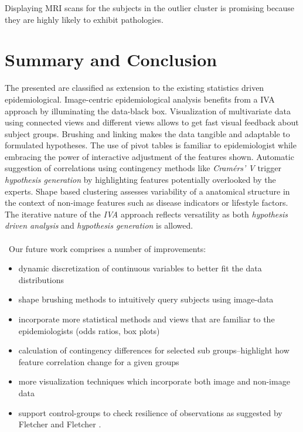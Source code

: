 \documentclass[journal]{style/vgtc} 			          %
\begin{document}
Displaying MRI scans for the subjects in the outlier cluster is promising because they are highly likely to exhibit pathologies.
%


\section{Summary and Conclusion}
The presented are classified as extension to the existing statistics driven epidemiological.
%
Image-centric epidemiological analysis benefits from a IVA approach by illuminating the data-black box.
%
Visualization of multivariate data using connected views and different views allows to get fast visual feedback about subject groups.
%
Brushing and linking makes the data tangible and adaptable to formulated hypotheses.
%
The use of pivot tables is familiar to epidemiologist while embracing the power of interactive adjustment of the features shown.
%
Automatic suggestion of correlations using contingency methods like \emph{Cram\'{e}rs' V} trigger \emph{hypothesis generation} by highlighting features potentially overlooked by the experts.
%
Shape based clustering assesses variability of a anatomical structure in the context of non-image features such as disease indicators or lifestyle factors.
%
The iterative nature of the \emph{IVA} approach reflects versatility as both \emph{hypothesis driven analysis} and \emph{hypothesis generation} is allowed.
\\\\\
Our future work comprises a number of improvements:
\begin{itemize}
	\item dynamic discretization of continuous variables to better fit the data distributions
	\item shape brushing methods to intuitively query subjects using image-data
	\item incorporate more statistical methods and views that are familiar to the epidemiologists (odds ratios, box plots)
	\item calculation of contingency differences for selected sub groups--highlight how feature correlation change for a given groups
	\item more visualization techniques which incorporate both image and non-image data
	\item support control-groups to check resilience of observations as suggested by Fletcher and Fletcher \cite{Fletcher2012}.
\end{itemize}
\end{document}
